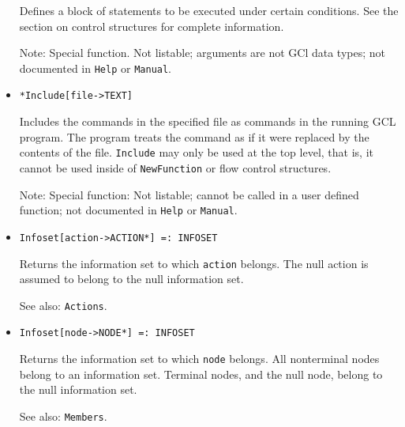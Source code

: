 \begin{itemize}
\bd
Defines a block of statements to be executed under certain conditions.
See the section on control structures for complete information. 
\item [Note:] Special function.  Not listable; arguments are not GCl
data types; not documented in \verb+Help+ or \verb+Manual+.  
\ed


\item
\protect \large \begin{verbatim}
*Include[file->TEXT]
\end{verbatim}\normalsize

\bd
Includes the commands in the specified file as commands
in the running GCL program.  The program treats the command as if it
were replaced by the contents of the file.  \verb+Include+ may only be used
at the top level, that is, it cannot be used inside of \verb+NewFunction+
or flow control structures.
\item [Note:] Special function:  Not listable; cannot be called in a
user defined function; not documented in \verb+Help+ or \verb+Manual+. 
\ed




\item
\protect \large \begin{verbatim}
Infoset[action->ACTION*] =: INFOSET
\end{verbatim} \normalsize

\bd
Returns the information set to which \verb+action+ belongs.  The null
action is assumed to belong to the null information set.
\item [See also:] \verb+Actions+.
\ed

\item
\protect \large \begin{verbatim}
Infoset[node->NODE*] =: INFOSET
\end{verbatim}\normalsize

\bd
Returns the information set to which \verb+node+
belongs.  All nonterminal nodes belong to an information set. 
Terminal nodes, and the null node, belong to the null information set.
\item [See also:] \verb+Members+.
\ed


\end{itemize}
